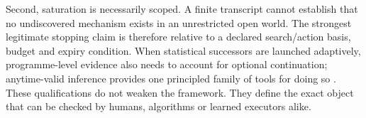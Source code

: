 Second, saturation is necessarily scoped. A finite transcript cannot establish that no undiscovered mechanism exists in an unrestricted open world. The strongest legitimate stopping claim is therefore relative to a declared search/action basis, budget and expiry condition. When statistical successors are launched adaptively, programme-level evidence also needs to account for optional continuation; anytime-valid inference provides one principled family of tools for doing so \cite{ramdas2023}. These qualifications do not weaken the framework. They define the exact object that can be checked by humans, algorithms or learned executors alike.
